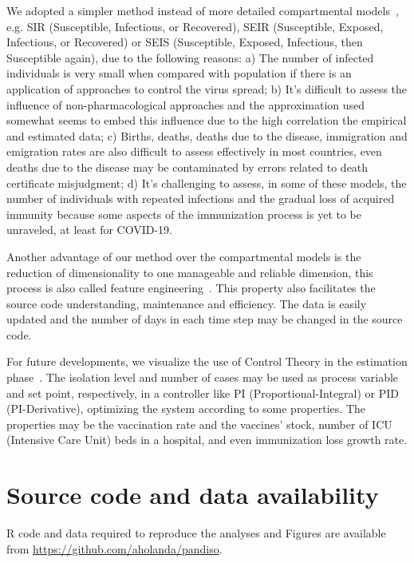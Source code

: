 \documentclass[times]{article}
\def\covid{\hbox{COVID-19}} %
\begin{document}
We adopted a simpler method instead of more detailed 
compartmental models~\cite{Ross1916,Ross1917a,Ross1917b}, 
e.g. SIR (Susceptible, Infectious, or Recovered), SEIR (Susceptible, Exposed, Infectious, or Recovered) 
or SEIS (Susceptible, Exposed, Infectious, then Susceptible again), due to the following reasons: 
a) The number of infected individuals is very small when compared with population if there is 
    an application of approaches to control the virus spread; 
b) It's difficult to assess the influence of non-pharmacological approaches and the approximation 
    used somewhat seems to embed this influence due to the high correlation 
   the empirical and estimated data; 
c) Births, deaths, deaths due to the disease, immigration and emigration rates 
   are also difficult to assess effectively in most countries, 
   even deaths due to the disease 
   may be contaminated by errors related to death certificate misjudgment; 
d) It's challenging to assess, in some of these models, the number of 
    individuals with repeated infections and the gradual loss of acquired 
    immunity because some aspects of the immunization process is 
   yet to be unraveled, at least for \covid.

Another advantage of our method over the compartmental models is the 
 reduction of dimensionality to one manageable and reliable dimension, 
this process is also called feature engineering~\cite{Spieg2019}. 
This property also facilitates the source code 
understanding, maintenance and efficiency. 
The data is easily updated and the number of days in each time step 
may be changed in the source code.

For future developments, we visualize the use of Control Theory 
in the estimation phase~\cite{Stewart2020}. 
The isolation level and number of cases 
may be used as process variable and set point, respectively, 
in a controller like PI (Proportional-Integral) or PID (PI-Derivative), 
optimizing the system according to some properties. 
The properties may be the vaccination rate and the vaccines’ stock, 
number of ICU (Intensive Care Unit) beds in a hospital, 
and even immunization loss growth rate.

\section*{Source code and data availability}
R code and data required to reproduce the analyses 
and Figures are available from
\url{https://github.com/aholanda/pandiso}.




\end{document}
